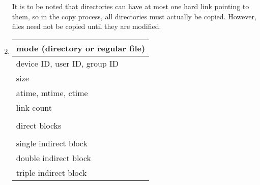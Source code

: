 \documentclass[11pt]{article}
\begin{document}
\begin{enumerate}
  It is to be noted that directories can have at most one hard link pointing to them, so in the copy process, all directories must actually be copied. However, files need not be copied until they are modified.
\item
  \begin{tabular}[t]{|l|}
    \hline
    mode (directory or regular file)\\
    \hline
    device ID, user ID, group ID\\
    \hline
    size\\
    \hline
    atime, mtime, ctime\\
    \hline
    link count\\
    \hline
    \\direct blocks\\\\
    \hline
    single indirect block\\
    \hline
    double indirect block\\
    \hline
    triple indirect block\\
    \hline
  \end{tabular}


\end{enumerate}
\end{document}
